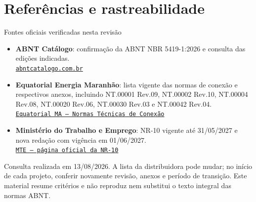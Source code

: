 \section{Referências e rastreabilidade}

\begin{frame}[shrink=4]{Fontes oficiais verificadas nesta revisão}
\small
\begin{itemize}
\item \textbf{ABNT Catálogo}: confirmação da ABNT NBR 5419-1:2026 e consulta das edições indicadas.\\
\href{https://www.abntcatalogo.com.br/}{\texttt{abntcatalogo.com.br}}
\item \textbf{Equatorial Energia Maranhão}: lista vigente das normas de conexão e respectivos anexos, incluindo NT.00001 Rev.09, NT.00002 Rev.10, NT.00004 Rev.08, NT.00020 Rev.06, NT.00030 Rev.03 e NT.00042 Rev.04.\\
\href{https://ma.equatorialenergia.com.br/institucional/leis-e-normas-tecnicas/normas-tecnicas/instalacao-de-padrao/}{\texttt{Equatorial MA — Normas Técnicas de Conexão}}
\item \textbf{Ministério do Trabalho e Emprego}: NR-10 vigente até 31/05/2027 e nova redação com vigência em 01/06/2027.\\
\href{https://www.gov.br/trabalho-e-emprego/pt-br/acesso-a-informacao/participacao-social/conselhos-e-orgaos-colegiados/comissao-tripartite-partitaria-permanente/normas-regulamentadora/normas-regulamentadoras-vigentes/norma-regulamentadora-no-10-nr-10}{\texttt{MTE — página oficial da NR-10}}
\end{itemize}
\begin{caixaAt}
Consulta realizada em 13/08/2026. A lista da distribuidora pode mudar; no início de cada projeto, conferir novamente revisão, anexos e período de transição. Este material resume critérios e não reproduz nem substitui o texto integral das normas ABNT.
\end{caixaAt}
\end{frame}

